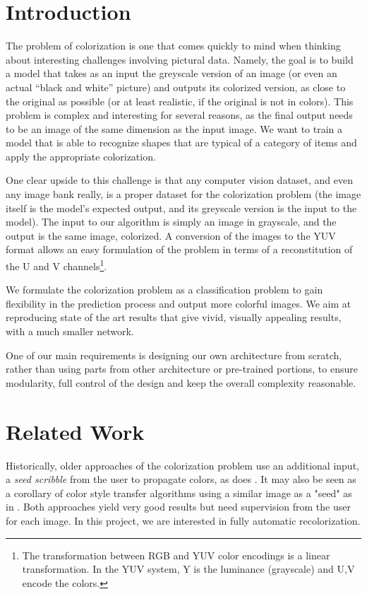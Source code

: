 \documentclass[10pt,twocolumn,letterpaper]{article}
\begin{document}
\section*{Introduction}

The problem of colorization is one that comes quickly to mind when thinking about interesting challenges involving pictural data. Namely, the goal is to build a model that takes as an input the greyscale version of an image (or even an actual ``black and white'' picture) and outputs its colorized version, as close to the original as possible (or at least realistic, if the original is not in colors). This problem is complex and interesting for several reasons, as the final output needs to be an image of the same dimension as the input image. We want to train a model that is able to recognize shapes that are typical of a category of items and apply the appropriate colorization.

One clear upside to this challenge is that any computer vision dataset, and even any image bank really, is a proper dataset for the colorization problem (the image itself is the model's expected output, and its greyscale version is the input to the model).
The input to our algorithm is simply an image in grayscale, and the output is the same image, colorized. A conversion of the images to the YUV format allows an easy formulation of the problem in terms of a reconstitution of the U and V channels\footnote{The transformation between RGB and YUV color encodings is a linear transformation. In the YUV system, Y is the luminance (grayscale) and U,V encode the colors.}.

We formulate the colorization problem as a classification problem to gain flexibility in the prediction process and output more colorful images. We aim at reproducing state of the art results that give vivid, visually appealing results, with a much smaller network.

One of our main requirements is designing our own architecture from scratch, rather than using parts from other architecture or pre-trained portions, to ensure modularity, full control of the design and keep the overall complexity reasonable.

\section{Related Work} \label{relatedwork}

Historically, older approaches of the colorization problem use an additional input, a \textit{seed scribble} from the user to propagate colors, as does \cite{levin2004colorization}. It may also be seen as a corollary of color style transfer algorithms using a similar image as a "seed" as in \cite{he2017neuralct}. Both approaches yield very good results but need supervision from the user for each image. In this project, we are interested in fully automatic recolorization.
\end{document}
